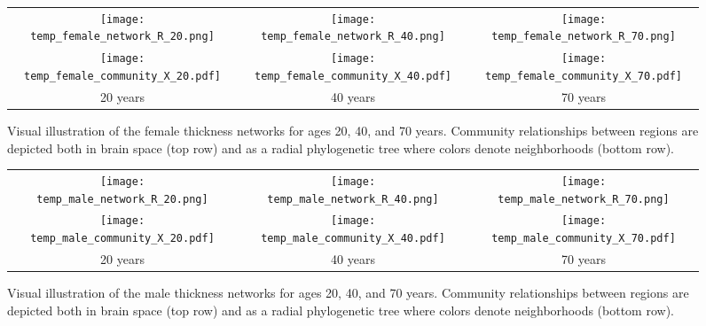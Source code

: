 \begin{figure*}[htb]
  \centering
  \begin{tabular}{ccc}
  \texttt{[image: temp\_female\_network\_R\_20.png]} &
  \texttt{[image: temp\_female\_network\_R\_40.png]} &
  \texttt{[image: temp\_female\_network\_R\_70.png]} \\
  \texttt{[image: temp\_female\_community\_X\_20.pdf]} &
  \texttt{[image: temp\_female\_community\_X\_40.pdf]} &
  \texttt{[image: temp\_female\_community\_X\_70.pdf]} \\
  20 years & 40 years & 70 years 
  \end{tabular}
  \caption{Visual illustration of the female thickness networks for ages 20, 40, 
  and 70 years.  Community relationships between regions are depicted both in 
  brain space (top row) and as a radial phylogenetic tree where colors denote 
  neighborhoods (bottom row).
  }
  \label{fig:femaleVisualNetworks}
\end{figure*}

\begin{figure*}[htb]
  \centering
  \begin{tabular}{ccc}
  \texttt{[image: temp\_male\_network\_R\_20.png]} &
  \texttt{[image: temp\_male\_network\_R\_40.png]} &
  \texttt{[image: temp\_male\_network\_R\_70.png]} \\
  \texttt{[image: temp\_male\_community\_X\_20.pdf]} &
  \texttt{[image: temp\_male\_community\_X\_40.pdf]} &
  \texttt{[image: temp\_male\_community\_X\_70.pdf]} \\
  20 years & 40 years & 70 years 
  \end{tabular}
  \caption{Visual illustration of the male thickness networks for ages 20, 40, 
  and 70 years.  Community relationships between regions are depicted both in 
  brain space (top row) and as a radial phylogenetic tree where colors denote 
  neighborhoods (bottom row).
  }
  \label{fig:maleVisualNetworks}
\end{figure*}



